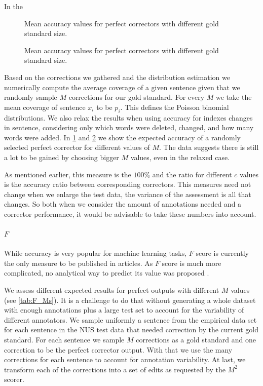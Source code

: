 \documentclass[english]{article}
\begin{document}
 In the
 
 \begin{figure}
 	\caption{Mean accuracy values for perfect correctors with different gold standard size.}
 	\label{fig:accuracy_vals}
 \end{figure}
  \begin{figure}
  	\caption{Mean accuracy values for perfect correctors with different gold standard size.}
  	\label{fig:accuracy_vals_ind}
  \end{figure}
 
 Based on the corrections we gathered and the distribution estimation we numerically compute the average coverage of a given sentence given that we randomly sample $M$ corrections for our gold standard. For every $M$ we take the mean coverage of sentence $x_i$ to be $p_i$. This defines the Poisson binomial distributions. We also relax the results when using accuracy for indexes changes in sentence, considering only which words were deleted, changed, and how many words were added. In \ref{fig:accuracy_vals} and \ref{fig:accuracy_vals_ind} we show the expected accuracy of a randomly selected perfect corrector for different values of $M$. The data suggests there is still a lot to be gained by choosing bigger $M$ values, even in the relaxed case.
 
  As mentioned earlier, this measure is the $100\%$ and the ratio for different $c$ values is the accuracy ratio between corresponding correctors. This measures need not change when we enlarge the test data, the variance of the assessment is all that changes. So both when we consider the amount of annotations needed and a corrector performance, it would be advisable to take these numbers into account.

\paragraph{$F$} While accuracy is very popular for machine learning tasks, $F$ score is currently the only measure to be published in articles. As $F$ score is much more complicated, no analytical way to predict its value was proposed \cite{yeh2000more}. 

We assess different expected results for perfect outputs with different $M$ values (see \ref{tab:F_Ms}). It is a challenge to do that without generating a whole dataset with enough annotations plus a large test set to account for the variability of different annotators. We sample uniformly a sentence from the empirical data set for each sentence in the NUS test data that needed correction by the current gold standard. For each sentence we sample $M$ corrections as a gold standard and one correction to be the perfect corrector output. With that we use the many corrections for each sentence to account for annotation variability. At last, we transform each of the corrections into a set of edits as requested by the $M^2$ scorer\cite{dahlmeier2012better}.  
\end{document}
